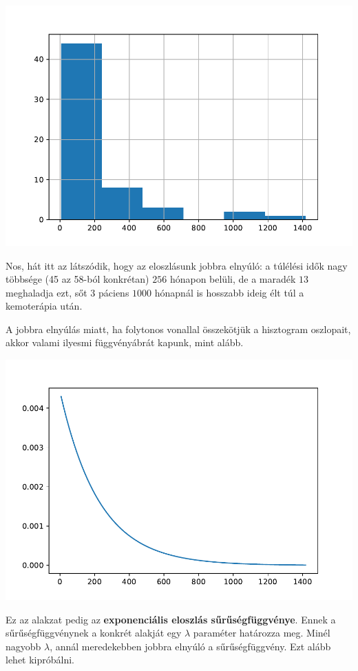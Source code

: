 \documentclass[
]{book}
\begin{document}
\includegraphics{_main_files/figure-latex/unnamed-chunk-180-5.pdf}

Nos, hát itt az látszódik, hogy az eloszlásunk jobbra elnyúló: a túlélési idők nagy többsége (45 az 58-ból konkrétan) \(256\) hónapon belüli, de a maradék \(13\) meghaladja ezt, sőt \(3\) páciens \(1000\) hónapnál is hosszabb ideig élt túl a kemoterápia után.

A jobbra elnyúlás miatt, ha folytonos vonallal összekötjük a hisztogram oszlopait, akkor valami ilyesmi függvényábrát kapunk, mint alább.

\includegraphics{_main_files/figure-latex/unnamed-chunk-181-7.pdf}

Ez az alakzat pedig az \textbf{exponenciális eloszlás sűrűségfüggvénye}. Ennek a sűrűségfüggvénynek a konkrét alakját egy \(\lambda\) paraméter határozza meg. Minél nagyobb \(\lambda\), annál meredekebben jobbra elnyúló a sűrűségfüggvény. Ezt alább lehet kipróbálni.
\end{document}
